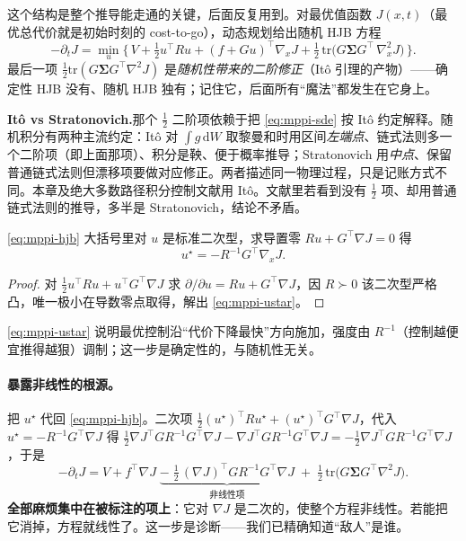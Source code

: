 \noindent 这个结构是整个推导能走通的关键，后面反复用到。对最优值函数 $J(x,t)$（最优总代价就是初始时刻的 cost-to-go），动态规划给出随机 HJB 方程
\begin{equation}
  -\partial_t J=\min_u\Big\{\,V+\tfrac12 u^\top R u+(f+Gu)^\top\nabla_x J+\tfrac12\,\mathrm{tr}\!\big(G\boldsymbol{\Sigma}G^\top\,\nabla_x^2 J\big)\,\Big\}.
  \label{eq:mppi-hjb}
\end{equation}
最后一项 $\tfrac12\mathrm{tr}(G\boldsymbol{\Sigma}G^\top\nabla^2 J)$ 是\emph{随机性带来的二阶修正}（Itô 引理的产物）——确定性 HJB 没有、随机 HJB 独有；记住它，后面所有“魔法”都发生在它身上。

\begin{note}
\textbf{Itô vs Stratonovich.}\;那个 $\tfrac12$ 二阶项依赖于把 \cref{eq:mppi-sde} 按 Itô 约定解释。随机积分有两种主流约定：Itô 对 $\int g\,\mathrm{d}W$ 取黎曼和时用区间\emph{左端点}、链式法则多一个二阶项（即上面那项）、积分是鞅、便于概率推导；Stratonovich 用\emph{中点}、保留普通链式法则但漂移项要做对应修正。两者描述同一物理过程，只是记账方式不同。本章及绝大多数路径积分控制文献用 Itô。文献里若看到没有 $\tfrac12$ 项、却用普通链式法则的推导，多半是 Stratonovich，结论不矛盾。
\end{note}

\begin{theorem}[最优控制正比于值函数负梯度]\label{thm:mppi-optu}
\cref{eq:mppi-hjb} 大括号里对 $u$ 是标准二次型，求导置零 $Ru+G^\top\nabla J=0$ 得
\begin{equation}
  u^\star=-R^{-1}G^\top\nabla_x J.
  \label{eq:mppi-ustar}
\end{equation}
\end{theorem}
\begin{proof}
对 $\tfrac12 u^\top R u+u^\top G^\top\nabla J$ 求 $\partial/\partial u=Ru+G^\top\nabla J$，因 $R\succ0$ 该二次型严格凸，唯一极小在导数零点取得，解出 \cref{eq:mppi-ustar}。
\end{proof}
\noindent \cref{eq:mppi-ustar} 说明最优控制沿“代价下降最快”方向施加，强度由 $R^{-1}$（控制越便宜推得越狠）调制；这一步是确定性的，与随机性无关。

\paragraph{暴露非线性的根源。}把 $u^\star$ 代回 \cref{eq:mppi-hjb}。二次项 $\tfrac12(u^\star)^\top R u^\star+(u^\star)^\top G^\top\nabla J$，代入 $u^\star=-R^{-1}G^\top\nabla J$ 得 $\tfrac12\nabla J^\top GR^{-1}G^\top\nabla J-\nabla J^\top GR^{-1}G^\top\nabla J=-\tfrac12\nabla J^\top GR^{-1}G^\top\nabla J$，于是
\begin{equation}
  -\partial_t J=V+f^\top\nabla J\;\underbrace{-\;\tfrac12\,(\nabla J)^\top GR^{-1}G^\top\nabla J}_{\text{非线性项}}\;+\;\tfrac12\,\mathrm{tr}\!\big(G\boldsymbol{\Sigma}G^\top\nabla^2 J\big).
  \label{eq:mppi-hjb2}
\end{equation}
\textbf{全部麻烦集中在被标注的项上}：它对 $\nabla J$ 是二次的，使整个方程非线性。若能把它消掉，方程就线性了。这一步是诊断——我们已精确知道“敌人”是谁。

